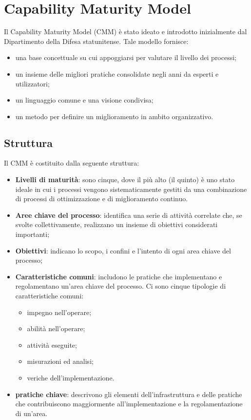 \documentclass[PianoDiQualifica.tex]{subfiles}
\begin{document}
\hypertarget{CMM_label}{\section{Capability Maturity Model}}
	Il Capability Maturity Model (CMM) è stato ideato e introdotto inizialmente dal Dipartimento della Difesa statunitense. Tale modello
	fornisce:
	\begin{itemize}
		\item una base concettuale su cui appoggiarsi per valutare il livello dei processi;
		\item un insieme delle migliori pratiche consolidate negli anni da esperti e utilizzatori;
		\item un linguaggio comune e una visione condivisa;
		\item un metodo per definire un miglioramento in ambito organizzativo.
	\end{itemize}
	\subsection{Struttura}
	Il CMM è costituito dalla seguente struttura:
	\begin{itemize}
		\item \textbf{Livelli di maturità}: sono cinque, dove il più alto (il quinto) è uno stato ideale in cui i processi vengono sistematicamente
		gestiti da una combinazione di processi di ottimizzazione e di miglioramento continuo. 
		\item \textbf{Aree chiave del processo}: identifica una serie di attività correlate che, se svolte collettivamente,
		realizzano un insieme di obiettivi considerati importanti;
		\item \textbf{Obiettivi}: indicano lo scopo, i confini e l'intento di ogni area chiave del processo;
		\item \textbf{Caratteristiche comuni}: includono le pratiche che implementano e regolamentano un'area chiave del processo. Ci sono cinque
		tipologie di caratteristiche comuni:
		\begin{itemize}
			\item impegno nell'operare;
			\item abilità nell'operare;
			\item attività eseguite;
			\item misurazioni ed analisi;
			\item veriche dell'implementazione.
		\end{itemize}
		\item \textbf{pratiche chiave}: descrivono gli elementi dell'infrastruttura e delle pratiche che contribuiscono maggiormente all'implementazione
		e la regolamentazione di un'area.
	\end{itemize}
	
\end{document}
